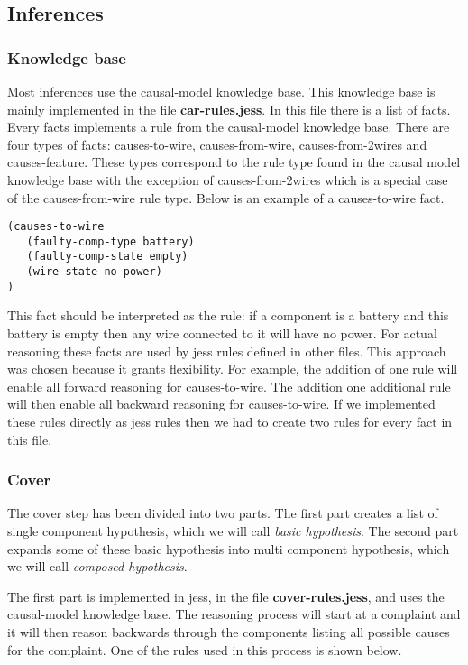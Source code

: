 \subsection{Inferences}
\subsubsection{Knowledge base}
Most inferences use the causal-model knowledge base. This knowledge base is mainly implemented in the file \textbf{car-rules.jess}. In this file there is a list of facts. Every facts implements a rule from the causal-model knowledge base. There are four types of facts: causes-to-wire, causes-from-wire, causes-from-2wires and causes-feature. These types correspond to the rule type found in the causal model knowledge base with the exception of causes-from-2wires which is a special case of the causes-from-wire rule type. Below is an example of a causes-to-wire fact.

\begin{verbatim}
(causes-to-wire
   (faulty-comp-type battery)
   (faulty-comp-state empty)
   (wire-state no-power)
)
\end{verbatim}

This fact should be interpreted as the rule: if a component is a battery and this battery is empty then any wire connected to it will have no power. For actual reasoning these facts are used by jess rules defined in other files. This approach was chosen because it grants flexibility. For example, the addition of one rule will enable all forward reasoning for causes-to-wire. The addition one additional rule will then enable all backward reasoning for causes-to-wire. If we implemented these rules directly as jess rules then we had to create two rules for every fact in this file.


\subsubsection{Cover}
The cover step has been divided into two parts. The first part creates a list of single component hypothesis, which we will call \emph{basic hypothesis}. The second part expands some of these basic hypothesis into multi component hypothesis, which we will call \emph{composed hypothesis}.

The first part is implemented in jess, in the file \textbf{cover-rules.jess}, and uses the causal-model knowledge base. The reasoning process will start at a complaint and it will then reason backwards through the components listing all possible causes for the complaint. One of the rules used in this process is shown below.

